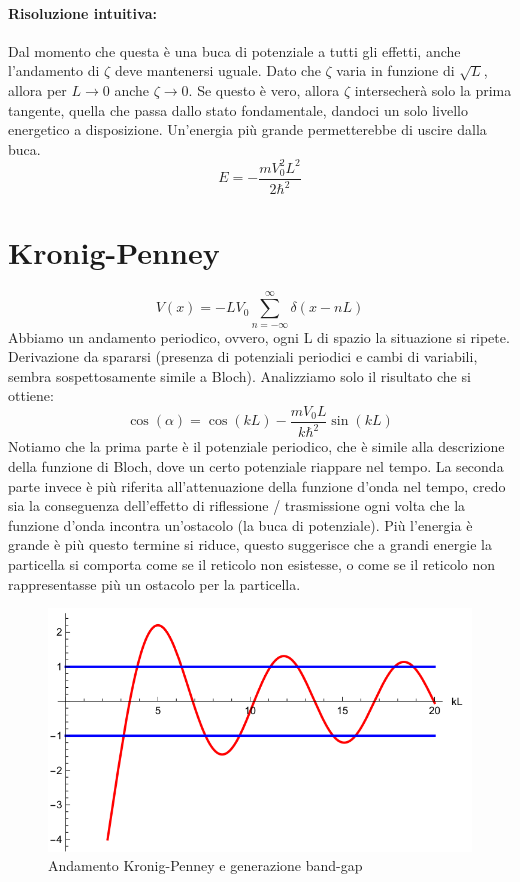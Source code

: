 \paragraph{Risoluzione intuitiva:} Dal momento che questa è una buca di potenziale a tutti gli effetti, anche l'andamento di $\zeta$ deve mantenersi uguale. Dato che $\zeta$ varia in funzione di $\sqrt{L}$, allora per $L\rightarrow 0$ anche $\zeta \rightarrow 0$. Se questo è vero, allora $\zeta$ intersecherà solo la prima tangente, quella che passa dallo stato fondamentale, dandoci un solo livello energetico a disposizione. Un'energia più grande permetterebbe di uscire dalla buca.
$$E=-\frac{mV_0^2L^2}{2\hbar^2}$$

\section{Kronig-Penney}

$$V(x) = -LV_0\sum_{n=-\infty}^{\infty}\delta(x-nL)$$
Abbiamo un andamento periodico, ovvero, ogni L di spazio la situazione si ripete. 
Derivazione da spararsi (presenza di potenziali periodici e cambi di variabili, sembra sospettosamente simile a Bloch).
Analizziamo solo il risultato che si ottiene:
$$\cos(\alpha) = \cos(kL) - \frac{mV_0L}{k\hbar^2}\sin(kL)$$
Notiamo che la prima parte è il potenziale periodico, che è simile alla descrizione della funzione di Bloch, dove un certo potenziale riappare nel tempo. La seconda parte invece è più riferita all'attenuazione della funzione d'onda nel tempo, credo sia la conseguenza dell'effetto di riflessione / trasmissione ogni volta che la funzione d'onda incontra un'ostacolo (la buca di potenziale). Più l'energia è grande è più questo termine si riduce, questo suggerisce che a grandi energie la particella si comporta come se il reticolo non esistesse, o come se il reticolo non rappresentasse più un ostacolo per la particella.

\begin{figure}[ht]
	\centering
	\includegraphics[width=.5\textwidth]{../images/Screenshot 2025-02-17 161537.png}
	\caption{Andamento Kronig-Penney e generazione band-gap}
	\label{fig:kronig}
\end{figure}

